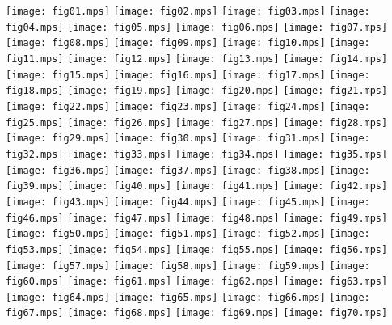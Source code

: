
\texttt{[image: fig01.mps]}
\newpage
\texttt{[image: fig02.mps]}
\newpage
\texttt{[image: fig03.mps]}
\newpage
\texttt{[image: fig04.mps]}
\newpage
\texttt{[image: fig05.mps]}
\newpage
\texttt{[image: fig06.mps]}
\newpage
\texttt{[image: fig07.mps]}
\newpage
\texttt{[image: fig08.mps]}
\newpage
\texttt{[image: fig09.mps]}
\newpage
\texttt{[image: fig10.mps]}
\newpage
\texttt{[image: fig11.mps]}
\newpage
\texttt{[image: fig12.mps]}
\newpage
\texttt{[image: fig13.mps]}
\newpage
\texttt{[image: fig14.mps]}
\newpage
\texttt{[image: fig15.mps]}
\newpage
\texttt{[image: fig16.mps]}
\newpage
\texttt{[image: fig17.mps]}
\newpage
\texttt{[image: fig18.mps]}
\newpage
\texttt{[image: fig19.mps]}
\newpage
\texttt{[image: fig20.mps]}
\newpage
\texttt{[image: fig21.mps]}
\newpage
\texttt{[image: fig22.mps]}
\newpage
\texttt{[image: fig23.mps]}
\newpage
\texttt{[image: fig24.mps]}
\newpage
\texttt{[image: fig25.mps]}
\newpage
\texttt{[image: fig26.mps]}
\newpage
\texttt{[image: fig27.mps]}
\newpage
\texttt{[image: fig28.mps]}
\newpage
\texttt{[image: fig29.mps]}
\newpage
\texttt{[image: fig30.mps]}
\newpage
\texttt{[image: fig31.mps]}
\newpage
\texttt{[image: fig32.mps]}
\newpage
\texttt{[image: fig33.mps]}
\newpage
\texttt{[image: fig34.mps]}
\newpage
\texttt{[image: fig35.mps]}
\newpage
\texttt{[image: fig36.mps]}
\newpage
\texttt{[image: fig37.mps]}
\newpage
\texttt{[image: fig38.mps]}
\newpage
\texttt{[image: fig39.mps]}
\newpage
\texttt{[image: fig40.mps]}
\newpage
\texttt{[image: fig41.mps]}
\newpage
\texttt{[image: fig42.mps]}
\newpage
\texttt{[image: fig43.mps]}
\newpage
\texttt{[image: fig44.mps]}
\newpage
\texttt{[image: fig45.mps]}
\newpage
\texttt{[image: fig46.mps]}
\newpage
\texttt{[image: fig47.mps]}
\newpage
\texttt{[image: fig48.mps]}
\newpage
\texttt{[image: fig49.mps]}
\newpage
\texttt{[image: fig50.mps]}
\newpage
\texttt{[image: fig51.mps]}
\newpage
\texttt{[image: fig52.mps]}
\newpage
\texttt{[image: fig53.mps]}
\newpage
\texttt{[image: fig54.mps]}
\newpage
\texttt{[image: fig55.mps]}
\newpage
\texttt{[image: fig56.mps]}
\newpage
\texttt{[image: fig57.mps]}
\newpage
\texttt{[image: fig58.mps]}
\newpage
\texttt{[image: fig59.mps]}
\newpage
\texttt{[image: fig60.mps]}
\newpage
\texttt{[image: fig61.mps]}
\newpage
\texttt{[image: fig62.mps]}
\newpage
\texttt{[image: fig63.mps]}
\newpage
\texttt{[image: fig64.mps]}
\newpage
\texttt{[image: fig65.mps]}
\newpage
\texttt{[image: fig66.mps]}
\newpage
\texttt{[image: fig67.mps]}
\newpage
\texttt{[image: fig68.mps]}
\newpage
\texttt{[image: fig69.mps]}
\newpage
\texttt{[image: fig70.mps]}
